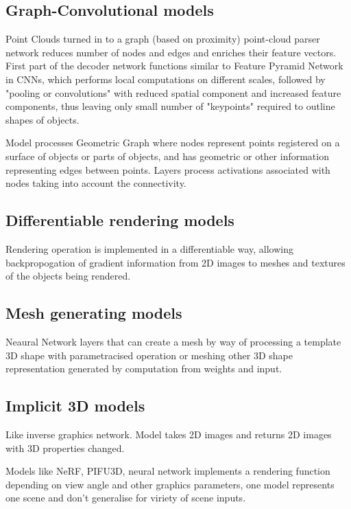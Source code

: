 \subsection{Graph-Convolutional models}

Point Clouds turned in to a graph (based on proximity) point-cloud parser network reduces number of nodes and edges and enriches their feature vectors. First part of the decoder network functions similar to Feature Pyramid Network in CNNs, which performs local computations on different scales, followed by "pooling or convolutions" with reduced spatial component and increased feature components, thus leaving only small number of "keypoints" required to outline shapes of objects.


Model processes Geometric Graph where nodes represent points registered on a surface of objects or parts of objects, and has geometric or other information representing edges between points. Layers process activations associated with nodes taking into account the connectivity.

\subsection{Differentiable rendering models}

Rendering operation is implemented in a differentiable way, allowing backpropogation of gradient information from 2D images to meshes and textures of the objects being rendered.

\subsection{Mesh generating models}

Neaural Network layers that can create a mesh by way of processing a template 3D shape with parametracised operation or meshing other 3D shape representation generated by computation from weights and input.

\subsection{Implicit 3D models}
Like inverse graphics network. Model takes 2D images and returns 2D images with 3D properties changed. 

Models like NeRF, PIFU3D, neural network implements a rendering function depending on view angle and other graphics parameters, one model represents one scene and don't generalise for viriety of scene inputs.


